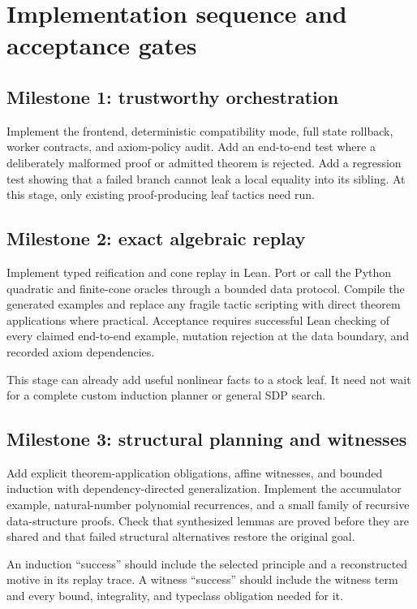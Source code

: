 \section{Implementation sequence and acceptance gates}

\subsection{Milestone 1: trustworthy orchestration}

Implement the frontend, deterministic compatibility mode, full state rollback, worker contracts, and axiom-policy audit. Add an end-to-end test where a deliberately malformed proof or admitted theorem is rejected. Add a regression test showing that a failed branch cannot leak a local equality into its sibling. At this stage, only existing proof-producing leaf tactics need run.

\subsection{Milestone 2: exact algebraic replay}

Implement typed reification and cone replay in Lean. Port or call the Python quadratic and finite-cone oracles through a bounded data protocol. Compile the generated examples and replace any fragile tactic scripting with direct theorem applications where practical. Acceptance requires successful Lean checking of every claimed end-to-end example, mutation rejection at the data boundary, and recorded axiom dependencies.

This stage can already add useful nonlinear facts to a stock \grind{} leaf. It need not wait for a complete custom induction planner or general SDP search.

\subsection{Milestone 3: structural planning and witnesses}

Add explicit theorem-application obligations, affine witnesses, and bounded induction with dependency-directed generalization. Implement the accumulator example, natural-number polynomial recurrences, and a small family of recursive data-structure proofs. Check that synthesized lemmas are proved before they are shared and that failed structural alternatives restore the original goal.

An induction ``success'' should include the selected principle and a reconstructed motive in its replay trace. A witness ``success'' should include the witness term and every bound, integrality, and typeclass obligation needed for it.

